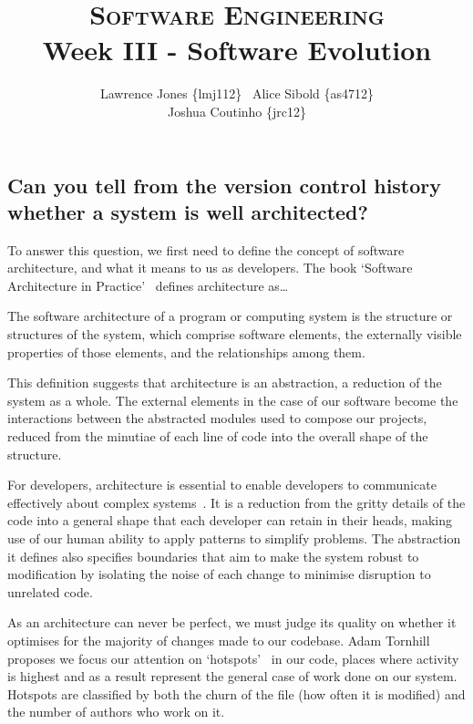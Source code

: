 \documentclass[11pt]{article}
\title{\textsc{Software Engineering}\\Week III - Software Evolution}
\author{Lawrence Jones \{lmj112\} \  Alice Sibold \{as4712\} \\
        Joshua Coutinho \{jrc12\}}
\date{}
\begin{document}
\maketitle


\subsection*{Can you tell from the version control history whether a system is
well architected?}

To answer this question, we first need to define the concept of software
architecture, and what it means to us as developers. The book `Software
Architecture in Practice'~\cite{softwareArchitectureInPractice} defines
architecture as\dots

\begin{displayquote}
The software architecture of a program or computing system is the structure or
structures of the system, which comprise software elements, the externally
visible properties of those elements, and the relationships among them.
\end{displayquote}

This definition suggests that architecture is an abstraction, a reduction of the
system as a whole. The external elements in the case of our software become the
interactions between the abstracted modules used to compose our projects,
reduced from the minutiae of each line of code into the overall shape of the
structure.

For developers, architecture is essential to enable developers to communicate
effectively about complex systems~\cite{anIntroductionToSoftwareArchitecture}.
It is a reduction from the gritty details of the code into a general shape that
each developer can retain in their heads, making use of our human ability to
apply patterns to simplify problems. The abstraction it defines also specifies
boundaries that aim to make the system robust to modification by isolating the
noise of each change to minimise disruption to unrelated code.

As an architecture can never be perfect, we must judge its quality on whether
it optimises for the majority of changes made to our codebase. Adam Tornhill
proposes we focus our attention on `hotspots'~\cite{codeAsCrimeScene} in our
code, places where activity is highest and as a result represent the general
case of work done on our system. Hotspots are classified by both the churn of
the file (how often it is modified) and the number of authors who work on it.
\end{document}
